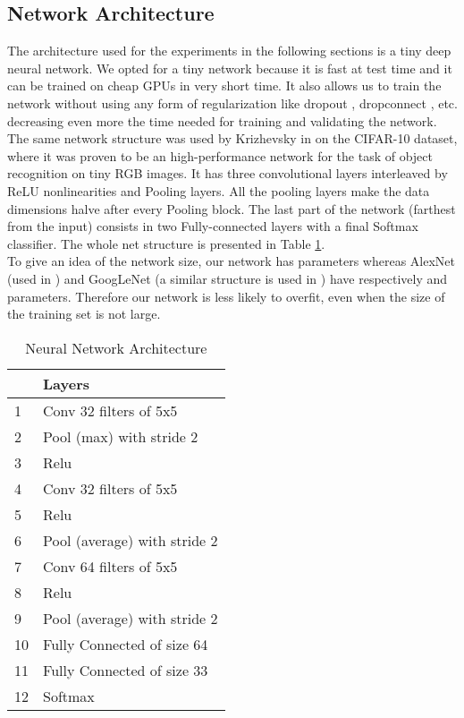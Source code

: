 \documentclass[final,5p,twocolumn]{elsarticle}
\begin{document}
\subsection{Network Architecture}
\label{sec:architecture}
The architecture used for the experiments in the following sections is a tiny deep neural network. We opted for a tiny network because it is fast at test time and it can be trained on cheap GPUs in very short time. It also allows us to train the network without using any form of regularization like dropout \cite{srivastava2014dropout}, dropconnect \cite{wan2013regularization}, etc. decreasing even more the time needed for training and validating the network.\\
The same network structure was used by Krizhevsky in \cite{krizhevsky2012imagenet} on the CIFAR-10 dataset, where it was proven to be an high-performance network for the task of object recognition on tiny RGB images. It has three convolutional layers interleaved by ReLU nonlinearities and Pooling layers. All the pooling layers make the data dimensions halve after every Pooling block. The last part of the network (farthest from the input) consists in two Fully-connected layers with a final Softmax classifier. The whole net structure is presented in Table \ref{tab:net_architecture}.\\
To give an idea of the network size, our network has  parameters whereas AlexNet (used in \cite{eggert2015benefit}) and GoogLeNet (a similar structure is used in \cite{iandola2015deeplogo}) have respectively  and  parameters. Therefore our network is less likely to overfit, even when the size of the training set is not large.

\begin{table}[htbpp]
	\caption{Neural Network Architecture}
	\label{tab:net_architecture}
	\center
\begin{tabular}{ll}
\toprule
 & \textbf{Layers}\\ \midrule
1 & Conv 32 filters of 5x5\\
2 & Pool (max) with stride 2\\
3 & Relu\\
4 & Conv 32 filters of 5x5\\
5 & Relu\\
6 & Pool (average) with stride 2\\
7 & Conv 64 filters of 5x5\\
8 & Relu\\
9 & Pool (average) with stride 2\\
10 & Fully Connected of size 64 \\
11 & Fully Connected of size 33 \\
12 & Softmax\\ \bottomrule
\end{tabular}
\end{table}
\end{document}
